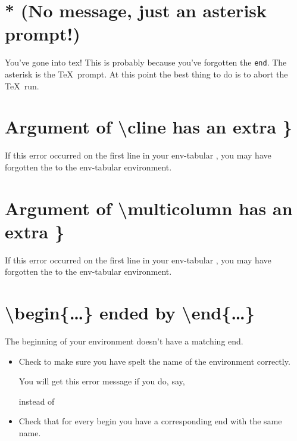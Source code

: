 \section{* (No message, just an asterisk prompt!)}

You've gone into \gls{tex}!  This is probably because 
you've forgotten the \texttt{\gls{end}}.  The asterisk is the 
\TeX\ prompt.  At this point the best thing to do is to abort the
\TeX\ run.


\section{Argument of \textbackslash cline has an extra \}}

If this error occurred on the first line in your \gls{env-tabular}
, you may have forgotten the
 to the \gls*{env-tabular} environment.


\section{Argument of \textbackslash multicolumn has an extra \}}

If this error occurred on the first line in your \gls{env-tabular}
, you may have forgotten the
 to the \gls*{env-tabular} environment.


\section{\textbackslash begin\{\texorpdfstring{\ldots}{...}\} ended by 
\textbackslash end\{\texorpdfstring{\ldots}{...}\}}

The beginning of your environment doesn't have a matching end.
\begin{itemize}
\item Check to make sure you have spelt the name of the environment 
correctly.

You will get this error message if you do, say,
\begin{alltt}\wrong
{}
\end{alltt}
instead of
\begin{alltt}\correct
{}
\end{alltt}

\item Check that for every \gls{begin} you have a corresponding 
\gls{end} with the same name.
\end{itemize}

